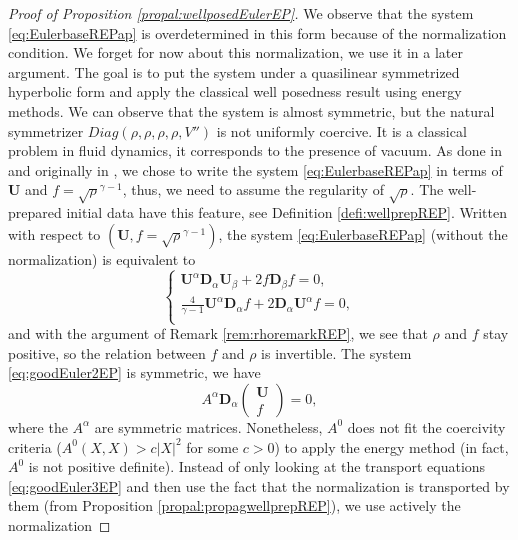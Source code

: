\documentclass[a4paper, 15pt]{article}
\numberwithin{equation}{section}
\begin{document}
\begin{proof}[Proof of Proposition \ref{propal:wellposedEulerEP}]
We observe that the system \eqref{eq:EulerbaseREPap} is overdetermined in this form because of the normalization condition. We forget for now about this normalization, we use it in a later argument. 
  The goal is to put the system under a quasilinear symmetrized hyperbolic form and apply the classical well posedness result using energy methods. We can observe that the system is almost symmetric, but the natural symmetrizer $Diag(\rho,\rho,\rho,\rho,V'')$ is not uniformly coercive. It is a classical problem in fluid dynamics, it corresponds to the presence of vacuum. As done in \cite{zbMATH05243173} and originally in \cite{zbMATH04039498}, we chose to write the system \eqref{eq:EulerbaseREPap} in terms of $\textbf{U}$ and $f=\sqrt{\rho}^{\gamma-1}$, thus, we need to assume the regularity of $\sqrt{\rho}$. The well-prepared initial data have this feature, see Definition \ref{defi:wellprepREP}. Written with respect to $(\textbf{U},f=\sqrt{\rho}^{\gamma-1})$, the system \eqref{eq:EulerbaseREPap} (without the normalization) is equivalent to 
  \begin{equation}
  \begin{cases}
  \label{eq:goodEuler2EP}
       \textbf{U}^\alpha\textbf{D}_\alpha \textbf{U}_\beta+2f\textbf{D}_\beta f=0,\\
        \frac{4}{\gamma-1}\textbf{U}^\alpha\textbf{D}_\alpha f+2\textbf{D}_\alpha \textbf{U}^\alpha f=0,\\
  \end{cases}
  \end{equation}
  and with the argument of Remark \ref{rem:rhoremarkREP}, we see that $\rho$ and $f$ stay positive, so the relation between $f$ and $\rho$ is invertible. The system \eqref{eq:goodEuler2EP} is symmetric, we have 
    \begin{equation}
    \label{eq:goodEuler3EP}
       A^\alpha\textbf{D}_\alpha\begin{pmatrix}
    \textbf{U} \\
    f
\end{pmatrix}=0,
  \end{equation}
  where the $A^\alpha$ are symmetric matrices. Nonetheless, $A^0$ does not fit the coercivity criteria ($A^0(X,X)>c|X|^2$ for some $c>0$) to apply the energy method (in fact, $A^0$ is not positive definite). Instead of only looking at the transport equations \eqref{eq:goodEuler3EP} and then use the fact that the normalization is transported by them (from Proposition \ref{propal:propagwellprepREP}), we use actively the normalization 

\end{proof}
\end{document}
